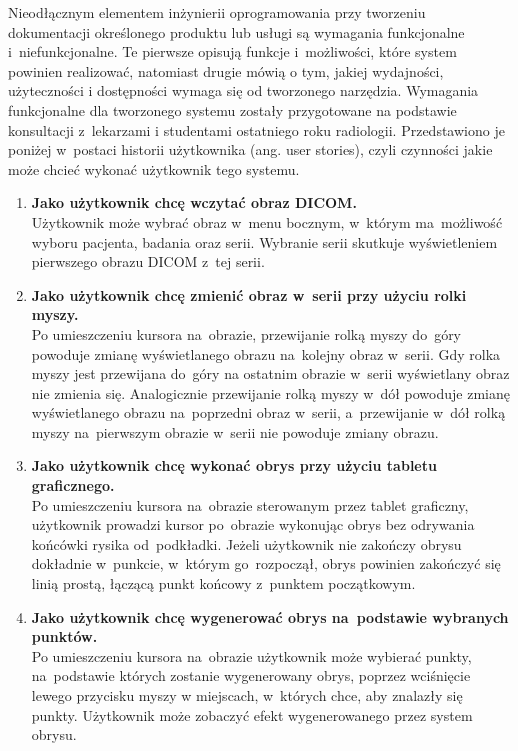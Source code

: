 \documentclass[a4paper,11pt,twoside,openright]{report}
\theoremstyle{definition}
\begin{document}
Nieodłącznym elementem inżynierii oprogramowania przy tworzeniu dokumentacji
określonego produktu lub usługi są wymagania funkcjonalne i~niefunkcjonalne.
Te pierwsze opisują funkcje i~możliwości, które system powinien realizować, natomiast
drugie mówią o tym, jakiej wydajności, użyteczności i dostępności wymaga się od tworzonego narzędzia.
Wymagania funkcjonalne dla tworzonego systemu zostały przygotowane na podstawie
konsultacji z~lekarzami i studentami ostatniego roku radiologii. Przedstawiono
je poniżej w~postaci historii użytkownika (ang. user stories), czyli czynności
jakie może chcieć wykonać użytkownik tego systemu.
\begin{enumerate}
\item \textbf {Jako użytkownik chcę wczytać obraz DICOM.} \\
Użytkownik może wybrać obraz w~menu bocznym, w~którym ma~możliwość wyboru pacjenta,
badania oraz serii. Wybranie serii skutkuje wyświetleniem pierwszego obrazu DICOM z~tej serii.

\item \textbf {Jako użytkownik chcę zmienić obraz w~serii przy użyciu rolki myszy.} \\
Po umieszczeniu kursora na~obrazie, przewijanie rolką myszy do~góry powoduje zmianę
wyświetlanego obrazu na~kolejny obraz w~serii. Gdy rolka myszy jest przewijana do~góry
na ostatnim obrazie w~serii wyświetlany obraz nie zmienia się. Analogicznie
przewijanie rolką myszy w~dół powoduje zmianę wyświetlanego obrazu na~poprzedni
obraz w~serii, a~przewijanie w~dół rolką myszy na~pierwszym obrazie w~serii nie
powoduje zmiany obrazu.

\item \textbf {Jako użytkownik chcę wykonać obrys przy użyciu tabletu graficznego.} \\
Po umieszczeniu kursora na~obrazie sterowanym przez tablet graficzny, użytkownik
prowadzi kursor po~obrazie wykonując obrys bez odrywania końcówki rysika od~podkładki.
Jeżeli użytkownik nie zakończy obrysu dokładnie w~punkcie, w~którym go~rozpoczął,
obrys powinien zakończyć się linią prostą, łączącą punkt końcowy z~punktem początkowym.

\item \textbf {Jako użytkownik chcę wygenerować obrys na~podstawie wybranych punktów.} \\
Po umieszczeniu kursora na~obrazie użytkownik może wybierać punkty, na~podstawie
których zostanie wygenerowany obrys, poprzez wciśnięcie lewego przycisku myszy w
miejscach, w~których chce, aby znalazły się punkty. Użytkownik może zobaczyć efekt
wygenerowanego przez system obrysu.


\end{enumerate}
\end{document}
